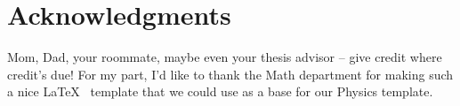 \documentclass[../main]{subfiles}
\begin{document}
\chapter*{Acknowledgments}

Mom, Dad, your roommate, maybe even your thesis advisor -- give credit where credit's due! For my part, I'd like to thank the Math department for making such a nice \LaTeX ~ template that we could use as a base for our Physics template.
\end{document}
